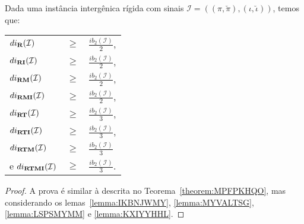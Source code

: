 \begin{theorem}\label{theorem:NFVKZGKW}
Dada uma instância intergênica rígida com sinais $\mathcal{I} = ((\pi,\breve\pi),(\iota,\breve\iota))$, temos que:

\begin{tabular}{lll}
  $di_{\textbf{R}}(\mathcal{I})$      & $ \ge $ & $\frac{ib_2(\mathcal{I})}{2}$, \\ 
  $di_{\textbf{RI}}(\mathcal{I})$     & $ \ge $ & $\frac{ib_2(\mathcal{I})}{2}$, \\
  $di_{\textbf{RM}}(\mathcal{I})$     & $ \ge $ & $\frac{ib_2(\mathcal{I})}{2}$, \\
  $di_{\textbf{RMI}}(\mathcal{I})$    & $ \ge $ & $\frac{ib_2(\mathcal{I})}{2}$, \\
  $di_{\textbf{RT}}(\mathcal{I})$     & $ \ge $ & $\frac{ib_2(\mathcal{I})}{3}$, \\
  $di_{\textbf{RTI}}(\mathcal{I})$    & $ \ge $ & $\frac{ib_2(\mathcal{I})}{3}$, \\
  $di_{\textbf{RTM}}(\mathcal{I})$    & $ \ge $ & $\frac{ib_2(\mathcal{I})}{3}$  \\
  e $di_{\textbf{RTMI}}(\mathcal{I})$ & $ \ge $ & $\frac{ib_2(\mathcal{I})}{3}$. \\
\end{tabular}
\end{theorem}
\begin{proof}
A prova é similar à descrita no Teorema~\ref{theorem:MPFPKHQO}, mas considerando os lemas~\ref{lemma:IKBNJWMY}, \ref{lemma:MYVALTSG}, \ref{lemma:LSPSMYMM} e \ref{lemma:KXIYYHHL}.
\end{proof}

